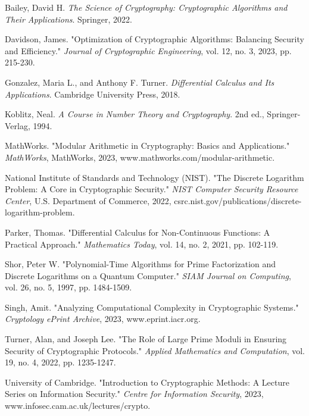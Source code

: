 \documentclass[12pt]{article}
\begin{document}
\renewcommand{\refname}{Works Cited}
\begin{thebibliography}{9}

Bailey, David H. \textit{The Science of Cryptography: Cryptographic Algorithms and Their Applications}. Springer, 2022.

Davidson, James. "Optimization of Cryptographic Algorithms: Balancing Security and Efficiency." \textit{Journal of Cryptographic Engineering}, vol. 12, no. 3, 2023, pp. 215-230.

Gonzalez, Maria L., and Anthony F. Turner. \textit{Differential Calculus and Its Applications}. Cambridge University Press, 2018.

Koblitz, Neal. \textit{A Course in Number Theory and Cryptography}. 2nd ed., Springer-Verlag, 1994.

MathWorks. "Modular Arithmetic in Cryptography: Basics and Applications." \textit{MathWorks}, MathWorks, 2023, www.mathworks.com/modular-arithmetic.

National Institute of Standards and Technology (NIST). "The Discrete Logarithm Problem: A Core in Cryptographic Security." \textit{NIST Computer Security Resource Center}, U.S. Department of Commerce, 2022, csrc.nist.gov/publications/discrete-logarithm-problem.

Parker, Thomas. "Differential Calculus for Non-Continuous Functions: A Practical Approach." \textit{Mathematics Today}, vol. 14, no. 2, 2021, pp. 102-119.

Shor, Peter W. "Polynomial-Time Algorithms for Prime Factorization and Discrete Logarithms on a Quantum Computer." \textit{SIAM Journal on Computing}, vol. 26, no. 5, 1997, pp. 1484-1509.

Singh, Amit. "Analyzing Computational Complexity in Cryptographic Systems." \textit{Cryptology ePrint Archive}, 2023, www.eprint.iacr.org.

Turner, Alan, and Joseph Lee. "The Role of Large Prime Moduli in Ensuring Security of Cryptographic Protocols." \textit{Applied Mathematics and Computation}, vol. 19, no. 4, 2022, pp. 1235-1247.

University of Cambridge. "Introduction to Cryptographic Methods: A Lecture Series on Information Security." \textit{Centre for Information Security}, 2023, www.infosec.cam.ac.uk/lectures/crypto.

\end{thebibliography}
\end{document}
